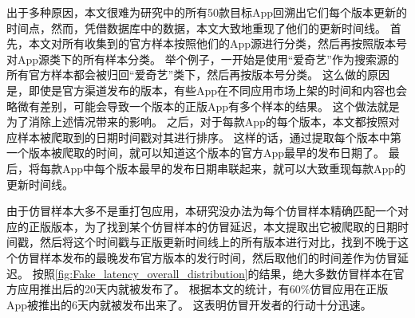 出于多种原因，本文很难为研究中的所有50款目标App回溯出它们每个版本更新的时间点，然而，凭借数据库中的数据，本文大致地重现了他们的更新时间线。
首先，本文对所有收集到的官方样本按照他们的App源进行分类，然后再按照版本号对App源类下的所有样本分类。
举个例子，一开始是使用``爱奇艺''作为搜索源的所有官方样本都会被归回``爱奇艺''类下，然后再按版本号分类。
这么做的原因是，即使是官方渠道发布的版本，有些App在不同应用市场上架的时间和内容也会略微有差别，可能会导致一个版本的正版App有多个样本的结果。
这个做法就是为了消除上述情况带来的影响。
之后，对于每款App的每个版本，本文都按照对应样本被爬取到的日期时间戳对其进行排序。
这样的话，通过提取每个版本中第一个版本被爬取的时间，就可以知道这个版本的官方App最早的发布日期了。
最后，将每款App中每个版本最早的发布日期串联起来，就可以大致重现每款App的更新时间线。

由于仿冒样本大多不是重打包应用，本研究没办法为每个仿冒样本精确匹配一个对应的正版版本，为了找到某个仿冒样本的仿冒延迟，本文提取出它被爬取的日期时间戳，然后将这个时间戳与正版更新时间线上的所有版本进行对比，找到不晚于这个仿冒样本发布的最晚发布官方版本的发行时间，然后取他们的时间差作为仿冒延迟。
按照\autoref{fig:Fake_latency_overall_distribution}的结果，绝大多数仿冒样本在官方应用推出后的20天内就被发布了。
根据本文的统计，有60\%仿冒应用在正版App被推出的6天内就被发布出来了。
这表明仿冒开发者的行动十分迅速。

